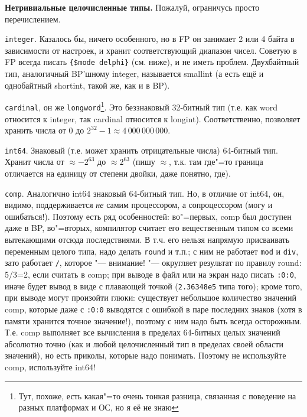 \textbf{Нетривиальные целочисленные типы.} Пожалуй, ограничусь просто перечислением.
\begin{ulist}
\item \texttt{integer}. Казалось бы, ничего особенного, но в FP он занимает 2 или 4 байта в 
зависимости от настроек, и хранит соответствующий диапазон чисел. Советую в FP всегда писать 
\verb|{$mode delphi}| (см. ниже), и не иметь проблем. Двухбайтный тип, 
аналогичный BP'шному integer, называется smallint (а есть ещё и однобайтный shortint, такой же, как 
и в BP). 
\item \texttt{cardinal}, он же \texttt{longword}\footnote{Тут, похоже, есть какая"=то очень тонкая 
разница, связанная с поведение на разных платформах и ОС, но я её не знаю}. Это беззнаковый 
32-битный тип (т.е. как word относится к integer, так cardinal относится к longint). 
Соответственно, позволяет хранить числа от 0 до $2^{32}-1\approx 4\,000\,000\,000$.
\item \texttt{int64}. Знаковый (т.е. может хранить отрицательные числа) 64-битный тип. 
Хранит числа от $\approx -2^{63}$ до $\approx 2^{63}$ (пишу 
$\approx$, т.к. там где"=то граница отличается на единицу от степени двойки, даже понятно, где). 
\item \texttt{comp}. Аналогично int64 знаковый 64-битный тип. Но, в отличие от int64, он, видимо, 
поддерживается \textit{не} самим процессором, а сопроцессором (могу и ошибаться!). Поэтому есть ряд 
особенностей: во"=первых, comp был доступен даже в BP, во"=вторых, 
компилятор считает его вещественным типом со всеми вытекающими отсюда последствиями. В т.ч. его 
нельзя напрямую присваивать переменным целого типа, надо делать \texttt{round} и т.п.; с ним не 
работает \texttt{mod} и \texttt{div}, зато работает \texttt{/}, которое "--- внимание! "--- 
округляет результат по правилу round: 5/3=2, если считать в comp; при выводе в файл или на экран 
надо писать \verb|:0:0|, иначе будет вывод в виде с плавающей точкой (\verb|2.36348e5| типа того); 
кроме того, при выводе могут произойти глюки: существует небольшое количество значений comp, 
которые даже с \verb|:0:0| выводятся с ошибкой в паре последних знаков (хотя в памяти хранится 
точное значение!), поэтому с ним надо быть всегда осторожным. Т.е. comp выполняет все вычисления в 
пределах 64-битных целых значений абсолютно точно (как и любой целочисленный тип в пределах своей 
области значений), но есть приколы, которые надо понимать. Поэтому не используйте comp, используйте 
int64!
\end{ulist}